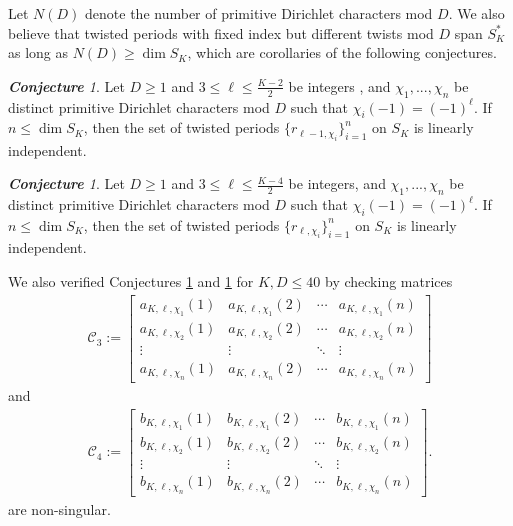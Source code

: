 \documentclass[11pt,letterpaper,reqno]{amsart}
\newcommand\ques[1]{\textcolor{blue}{\textbf{Question}: #1}}
\numberwithin{figure}{section}
\numberwithin{table}{section}
\theoremstyle{definition}
\theoremstyle{plain}
\theoremstyle{definition}
\theoremstyle{definition}
\theoremstyle{remark}
\newtheorem{conjecture}[theorem]{\bf Conjecture}
\numberwithin{equation}{section}
\theoremstyle{remark}
\begin{document}
Let $N(D)$ denote the number of primitive Dirichlet characters mod $D$. We also believe that twisted periods with fixed index but different twists mod $D$ span $S_K^{\ast}$ as long as $N(D)\geq \dim S_K$, which are corollaries of the following conjectures. 
 \begin{conjecture}\label{conj:differentchi}
       Let $D\geq1$ and $3\leq\ell\leq\frac{K-2}{2}$  be integers %
       , and $\chi_1,...,\chi_n$ be distinct primitive Dirichlet characters mod $D$ such that $\chi_i(-1)=(-1)^{\ell}$. If $n\leq \dim S_K$, then the set of twisted periods $\{r_{\ell-1,\chi_i}\}_{i=1}^n$ on $S_K$ is linearly independent.
 \end{conjecture}   
 \begin{conjecture}\label{conj:differentchibracket}
       Let $D\geq1$ and $3\leq\ell\leq\frac{K-4}{2}$  be integers, and $\chi_1,...,\chi_n$ be distinct primitive Dirichlet characters mod $D$ such that $\chi_i(-1)=(-1)^{\ell}$. If $n\leq \dim S_K$, then the set of twisted periods $\{r_{\ell,\chi_i}\}_{i=1}^n$ on $S_K$ is linearly independent.
 \end{conjecture}   
We also verified Conjectures \ref{conj:differentchi} and \ref{conj:differentchibracket} for $K,D\leq40$ \cite{codefortwisted} by checking  matrices 
\begin{align*}
  \mathcal{C}_3:=\begin{bmatrix}
        a_{K,\ell,\chi_1}(1) & a_{K,\ell,\chi_1}(2) & \cdots & a_{K,\ell,\chi_1}(n) \\ a_{K,\ell,\chi_2}(1) & a_{K,\ell,\chi_2}(2) & \cdots & a_{K,\ell,\chi_2}(n) \\ \vdots &\vdots &\ddots &\vdots\\a_{K,\ell,\chi_n}(1) & a_{K,\ell,\chi_n}(2) & \cdots & a_{K,\ell,\chi_n}(n) 
    \end{bmatrix}\end{align*}
    and
    \begin{align*}
    \mathcal{C}_4:=\begin{bmatrix}
        b_{K,\ell,\chi_1}(1) & b_{K,\ell,\chi_1}(2) & \cdots & b_{K,\ell,\chi_1}(n) \\ b_{K,\ell,\chi_2}(1) & b_{K,\ell,\chi_2}(2) & \cdots & b_{K,\ell,\chi_2}(n) \\ \vdots &\vdots &\ddots &\vdots\\b_{K,\ell,\chi_n}(1) & b_{K,\ell,\chi_n}(2) & \cdots & b_{K,\ell,\chi_n}(n) 
    \end{bmatrix}.
\end{align*}
are non-singular.
\end{document}

